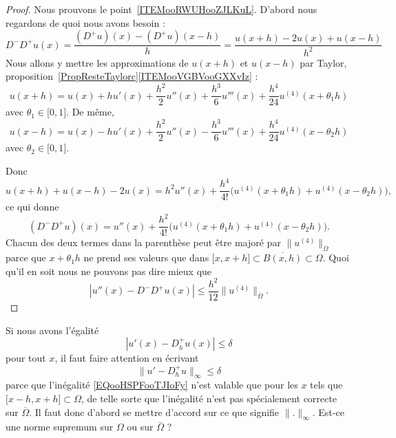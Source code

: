 \begin{proof}
	Nous prouvons le point~\ref{ITEMooRWUHooZJLKuL}. D'abord nous regardons de quoi nous avons besoin :
	\begin{equation}        \label{EQooBLIIooWHXbqD}
		D^-D^+u(x)=\frac{ (D^+u)(x)-(D^+u)(x-h) }{ h }=\frac{ u(x+h)-2u(x)+u(x-h) }{ h^2 }
	\end{equation}
    Nous allons y mettre les approximations de \( u(x+h)\) et \( u(x-h)\) par Taylor, proposition~\ref{PropResteTaylorc}\ref{ITEMooVGBVooGXXvIz} :
	\begin{equation}
		u(x+h)=u(x)+hu'(x)+\frac{ h^2 }{2}u''(x)+\frac{ h^3 }{ 6 }u'''(x)+\frac{ h^4 }{ 24 }u^{(4)}(x+\theta_1h)
	\end{equation}
	avec \( \theta_1\in \mathopen[ 0 , 1 \mathclose]\). De même,
	\begin{equation}
		u(x-h)=u(x)-hu'(x)+\frac{ h^2 }{2}u''(x)-\frac{ h^3 }{ 6 }u'''(x)+\frac{ h^4 }{ 24 }u^{(4)}(x-\theta_2h)
	\end{equation}
	avec \( \theta_2\in \mathopen[ 0 , 1 \mathclose]\).

	Donc
	\begin{equation}
		u(x+h)+u(x-h)-2u(x)=h^2u''(x)+\frac{ h^4 }{ 4! }\Big( u^{(4)}(x+\theta_1h)+u^{(4)}(x-\theta_2h) \Big),
	\end{equation}
	ce qui donne
	\begin{equation}
		(D^-D^+u)(x)=u''(x)+\frac{ h^2 }{ 4! }\Big( u^{(4)}(x+\theta_1h)+u^{(4)}(x-\theta_2h) \Big).
	\end{equation}
    Chacun des deux termes dans la parenthèse peut être majoré par \( \| u^{(4)} \|_{\Omega}\) parce que \( x+\theta_1h\) ne prend ses valeurs que dans \( \mathopen[ x , x+h \mathclose]\subset\overline{ B(x,h) }\subset\Omega\). Quoi qu'il en soit nous ne pouvons pas dire mieux que
	\begin{equation}
		| u''(x)-D^-D^+u(x) |\leq \frac{ h^2 }{ 12 }\| u^{(4)} \|_{\overline{ \Omega }}.
	\end{equation}
\end{proof}

\begin{remark}
    Si nous avons l'égalité
	\begin{equation}        \label{EQooHSPFooTJIoFy}
		| u'(x)-D_h^+u(x) |\leq \delta
	\end{equation}
	pour tout \( x\), il faut faire attention en écrivant
	\begin{equation}
		\| u'-D_h^+u \|_{\infty}\leq \delta
	\end{equation}
    parce que l'inégalité \eqref{EQooHSPFooTJIoFy} n'est valable que pour les \( x\) tels que \( \mathopen[ x-h , x+h \mathclose]\subset \Omega\), de telle sorte que l'inégalité n'est pas spécialement correcte sur \( \overline{ \Omega }\). Il faut donc d'abord se mettre d'accord sur ce que signifie \( \| . \|_{\infty}\). Est-ce une norme supremum sur \( \Omega\) ou sur \( \bar \Omega\) ?
\end{remark}

